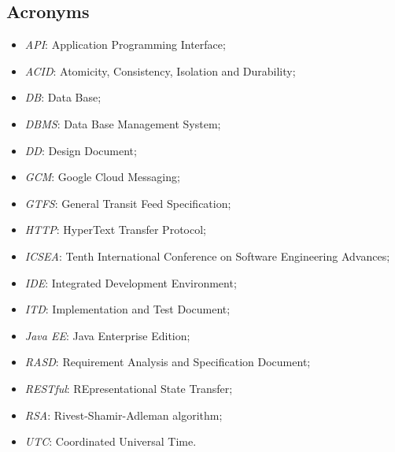 \subsection{Acronyms}
	\begin{itemize}
	\item \textit{API}: Application Programming Interface;
	\item \textit{ACID}: Atomicity, Consistency, Isolation and Durability;
	\item \textit{DB}: Data Base;
	\item \textit{DBMS}: Data Base Management System;
	\item \textit{DD}: Design Document;
	\item \textit{GCM}: Google Cloud Messaging;
	\item \textit{GTFS}: General Transit Feed Specification;
	\item \textit{HTTP}: HyperText Transfer Protocol;
	\item \textit{ICSEA}: Tenth International Conference on Software Engineering Advances;
	\item \textit{IDE}: Integrated Development Environment;
	\item \textit{ITD}: Implementation and Test Document;
	\item \textit{Java EE}: Java Enterprise Edition;
	\item \textit{RASD}: Requirement Analysis and Specification Document;
	\item \textit{RESTful}: REpresentational State Transfer;
	\item \textit{RSA}: Rivest-Shamir-Adleman algorithm;
	\item \textit{UTC}: Coordinated Universal Time.
	\end{itemize}